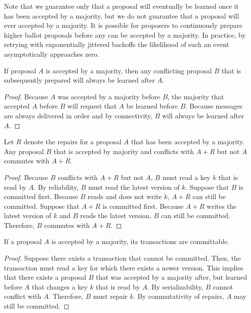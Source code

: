 \documentclass{article}
\begin{document}
    Note that we guarantee only that a proposal will eventually be learned once it has been accepted
    by a majority, but we do not guarantee that a proposal will ever accepted by a majority. It is
    possible for proposers to continuously prepare higher ballot proposals before any can be
    accepted by a majority. In practice, by retrying with exponentially jittered backoffs the
    likelihood of such an event asymptotically approaches zero. \\

    \begin{theorem}[Serializability]
    If proposal $A$ is accepted by a majority, then any conflicting proposal $B$ that is
    subsequently prepared will always be learned after $A$.
    \end{theorem}
    \begin{proof}
    Because $A$ was accepted by a majority before $B$, the majority that accepted $A$ before $B$
    will request that $A$ be learned before $B$. Because messages are always delivered in order
    and by connectivity, $B$ will always be learned after $A$.
    \end{proof}

    \begin{theorem}
    Let $R$ denote the repairs for a proposal $A$ that has been accepted by a majority. Any proposal
    $B$ that is accepted by majority and conflicts with $A + R$ but not $A$ commutes with $A + R$.
    \end{theorem}
    \begin{proof}
    Because $B$ conflicts with $A + R$ but not $A$, $B$ must read a key $k$ that is read by $A$.
    By reliability, $B$ must read the latest version of $k$. Suppose that $B$ is committed first.
    Because $B$ reads and does not write $k$, $A + R$ can still be committed. Suppose that
    $A + R$ is committed first. Because $A + R$ writes the latest version of $k$ and $B$ reads the
    latest version, $B$ can still be committed. Therefore, $B$ commutes with $A + R$.
    \end{proof}

    \begin{theorem}[Consistency]
    If a proposal $A$ is accepted by a majority, its transactions are committable.
    \end{theorem}
    \begin{proof}
    Suppose there exists a transaction that cannot be committed. Then, the transaction must read a
    key for which there exists a newer version. This implies that there exists a proposal $B$ that
    was accepted by a majority after, but learned before $A$ that changes a key $k$ that is read
    by $A$. By serializability, $B$ cannot conflict with $A$. Therefore, $B$ must repair $k$. By
    commutativity of repairs, $A$ may still be committed.
    \end{proof}
\end{document}
